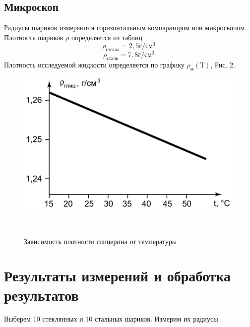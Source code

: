 \documentclass[a4paper,12pt]{article}
\theoremstyle{plain} %
\theoremstyle{definition} %
\theoremstyle{remark} %
\begin{document}
\subsection{Микроскоп}
Радиусы шариков измеряются горизонтальным компаратором или микроскопом. Плотность шариков $\rho$ определяется из таблиц 
\[\rho_{\text{стекла}} = 2,5\text{г}/\text{см}^3\]
\[\rho_{\text{стали}} = 7,8\text{г}/\text{см}^3\]
 Плотность исследуемой жидкости определяется по графику $\rho_{\text{ж}}(Т)$, Рис. 2.
 \begin{figure}[!h]
 	\begin{center}
 		\includegraphics[width=0.5\linewidth]{2}
 	\end{center}\
 	\caption{Зависимость плотности глицерина от температуры}
 \end{figure}

\section{Результаты измерений и обработка результатов}
\noindent Выберем 10 стеклянных и 10 стальных шариков. Измерим их радиусы.
\end{document}
